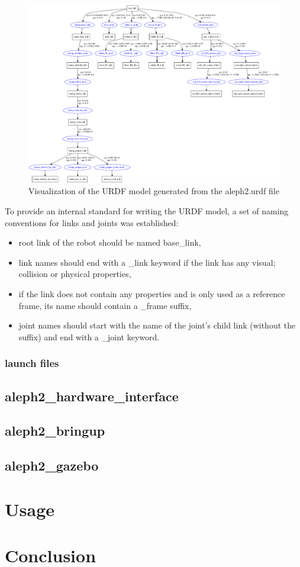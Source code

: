 \documentclass[english,inz,shortabstract]{iithesis}
\begin{document}
    \begin{figure}[ht]
        \centering
        \includegraphics[width=\textwidth]{img/aleph2_description.pdf}
        \caption{Visualization of the URDF model generated from the \textsf{aleph2.urdf} file}
        \label{fig:aleph2_description}
    \end{figure}

    To provide an internal standard for writing the URDF model, a set of naming conventions for links and joints was established:

    \begin{itemize} 
        \item root link of the robot should be named \textsf{base\_link},
        \item link names should end with a \textsf{\_link} keyword if the link has any visual; collision or physical properties,
        \item if the link does not contain any properties and is only used as a reference frame, its name should contain a \textsf{\_frame} suffix,
        \item joint names should start with the name of the joint's child link (without the suffix) and end with a \textsf{\_joint} keyword.
    \end{itemize}

    \subsection{launch files}
    \lipsum[1]

\section{aleph2\_hardware\_interface}

\section{aleph2\_bringup}

\section{aleph2\_gazebo}

\chapter{Usage}

\chapter{Conclusion}



\end{document}
